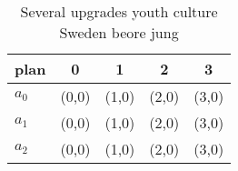 \documentclass[a4paper]{article}
\begin{document}
\begin{table}
\begin{adjustbox}{width=0.6\columnwidth}
\begin{tabular}{|l|l|l|l|l|}
\hline
\textbf{plan} & \multicolumn{1}{c|}{\textbf{0}} & \multicolumn{1}{c|}{\textbf{1}} & \multicolumn{1}{c|}{\textbf{2}} & \multicolumn{1}{c|}{\textbf{3}} \\ \hline
\textbf{$a_0$}  & (0,0) & (1,0) & (2,0) & (3,0) \\ \hline
\textbf{$a_1$}  & (0,0) & (1,0) & (2,0) & (3,0) \\ \hline
\textbf{$a_2$}  & (0,0) & (1,0) & (2,0) & (3,0) \\ \hline
\end{tabular}
\end{adjustbox}
\caption{Several upgrades youth culture Sweden beore jung 
}
\end{table}
\end{document}
